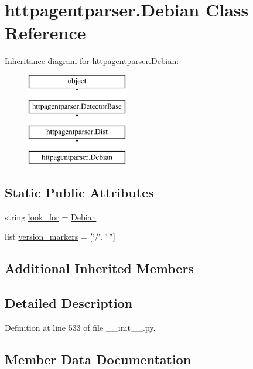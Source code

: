 \hypertarget{classhttpagentparser_1_1_debian}{}\section{httpagentparser.\+Debian Class Reference}
\label{classhttpagentparser_1_1_debian}
Inheritance diagram for httpagentparser.\+Debian\+:\begin{figure}[H]
\begin{center}
\leavevmode
\includegraphics[height=4.000000cm]{classhttpagentparser_1_1_debian}
\end{center}
\end{figure}
\subsection*{Static Public Attributes}
\begin{DoxyCompactItemize}
\item 
string \hyperlink{classhttpagentparser_1_1_debian_ab4dafcd0efc0d5822ed8d206f0d22407}{look\+\_\+for} = \textquotesingle{}\hyperlink{classhttpagentparser_1_1_debian}{Debian}\textquotesingle{}
\item 
list \hyperlink{classhttpagentparser_1_1_debian_a522cfd32af8b7c5f1f9cf7c09dc7b54c}{version\+\_\+markers} = \mbox{[}\char`\"{}/\char`\"{}, \char`\"{} \char`\"{}\mbox{]}
\end{DoxyCompactItemize}
\subsection*{Additional Inherited Members}


\subsection{Detailed Description}


Definition at line 533 of file \+\_\+\+\_\+init\+\_\+\+\_\+.\+py.



\subsection{Member Data Documentation}
\hypertarget{classhttpagentparser_1_1_debian_ab4dafcd0efc0d5822ed8d206f0d22407}{}\label{classhttpagentparser_1_1_debian_ab4dafcd0efc0d5822ed8d206f0d22407} 
